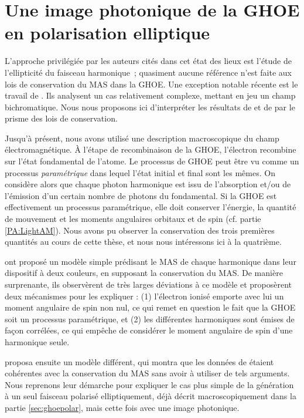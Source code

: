 \section{Une image photonique de la GHOE en polarisation elliptique}
L'approche privilégiée par les auteurs cités dans cet état des lieux est l'étude de l'ellipticité du faisceau harmonique~; quasiment aucune référence n'est faite aux lois de conservation du MAS dans la GHOE. Une exception notable récente est le travail de . Ils analysent un cas relativement complexe, mettant en jeu un champ bichromatique. Nous nous proposons ici d'interpréter les résultats de  et de  par le prisme des lois de conservation.

Jusqu'à présent, nous avons utilisé une description macroscopique du champ électromagnétique. \`A l'étape de recombinaison de la GHOE, l'électron recombine sur l'état fondamental de l'atome. Le processus de GHOE peut être vu comme un processus \textit{paramétrique} dans lequel l'état initial et final sont les mêmes. On considère alors que chaque photon harmonique est issu de l'absorption et/ou de l'émission d'un certain nombre de photons du fondamental. Si la GHOE est effectivement un processus paramétrique, elle doit conserver l'énergie, la quantité de mouvement et les moments angulaires orbitaux et de spin (cf. partie \ref{PA:LightAM}). Nous avons pu observer la conservation des trois premières quantités au cours de cette thèse, et nous nous intéressons ici à la quatrième.

 ont proposé un modèle simple prédisant le MAS de chaque harmonique dans leur dispositif à deux couleurs, en supposant la conservation du MAS. De manière surprenante, ils observèrent de très larges déviations à ce modèle et proposèrent deux mécanismes pour les expliquer : (1) l'électron ionisé emporte avec lui un moment angulaire de spin non nul, ce qui remet en question le fait que la GHOE soit un processus paramétrique, et (2) les différentes harmoniques sont émises de façon corrélées, ce qui empêche de considérer le moment angulaire de spin d'une harmonique seule.\par
{} proposa ensuite un modèle différent, qui montra que les données de  étaient cohérentes avec la conservation du MAS sans avoir à utiliser de tels arguments. Nous reprenons leur démarche pour expliquer le cas plus simple de la génération à un seul faisceau polarisé elliptiquement, déjà décrit macroscopiquement dans la partie \ref{sec:ghoepolar}, mais cette fois avec une image photonique.

